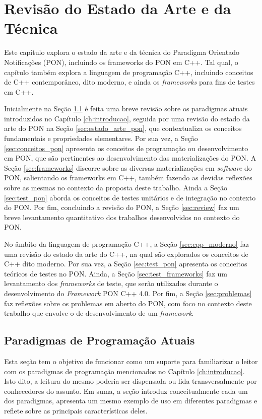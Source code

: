 \chapter{Revisão do Estado da Arte e da Técnica}\label{ch:arte}

Este capítulo explora o estado da arte e da técnica do Paradigma Orientado
Notificações (PON), incluindo os frameworks do PON em C++. Tal qual, o capítulo
também explora a linguagem de programação C++, incluindo conceitos de C++
contemporâneo, dito moderno, e ainda os \textit{frameworks} para fins de testes
em C++.

Inicialmente na Seção \ref{sec:paradigmas} é feita uma breve revisão sobre os
paradigmas atuais introduzidos no Capítulo \ref{ch:introducao}, seguida por uma
revisão do estado da arte do PON na Seção \ref{sec:estado_arte_pon}, que
contextualiza os conceitos fundamentais e propriedades elementares. Por sua vez,
a Seção \ref{sec:conceitos_pon} apresenta os conceitos de programação ou
desenvolvimento em PON, que são pertinentes ao desenvolvimento das
materializações do PON. A Seção \ref{sec:frameworks} discorre sobre as diversas
materializações em \textit{software} do PON, salientando os frameworks em C++,
também fazendo as devidas reflexões sobre as mesmas no contexto da proposta
deste trabalho. Ainda a Seção \ref{sec:test_pon} aborda os conceitos de testes
unitários e de integração no contexto do PON. Por fim, concluindo a revisão do
PON, a Seção \ref{sec:review} faz um breve levantamento quantitativo dos
trabalhos desenvolvidos no contexto do PON.

No âmbito da linguagem de programação C++, a Seção \ref{sec:cpp_moderno} faz uma
revisão do estado da arte do C++, na qual são explorados os conceitos de C++
dito moderno. Por sua vez, a Seção \ref{sec:test_pon} apresenta os conceitos
teóricos de testes no PON. Ainda, a Seção \ref{sec:test_frameworks} faz um
levantamento dos \textit{frameworks} de teste, que serão utilizados durante o
desenvolvimento do \textit{Framework} PON C++ 4.0. Por fim, a Seção
\ref{sec:problemas} faz reflexões sobre os problemas em aberto do PON, com foco
no contexto deste trabalho que envolve  o de desenvolvimento de um
\textit{framework}.

\section{Paradigmas de Programação Atuais}\label{sec:paradigmas}

Esta seção tem o objetivo de funcionar como um suporte para familiarizar o
leitor com os paradigmas de programação mencionados no Capítulo
\ref{ch:introducao}. Isto dito, a leitura do mesmo poderia ser dispensada ou
lida transversalmente por conhecedores do assunto. Em suma, a seção introduz
conceitualmente cada um dos paradigmas, apresenta um mesmo exemplo de uso em
diferentes paradigmas e reflete sobre as principais características deles.

